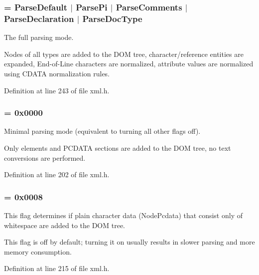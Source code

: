 \hypertarget{namespacephys_1_1xml_af1c356f1eb063a63efebd6c8a5241c63}{
\subsubsection[{ParseFull}]{ = {\bf ParseDefault} $|$ {\bf ParsePi} $|$ {\bf ParseComments} $|$ {\bf ParseDeclaration} $|$ {\bf ParseDocType}}}
\label{d9/d27/namespacephys_1_1xml_af1c356f1eb063a63efebd6c8a5241c63}


The full parsing mode. 

Nodes of all types are added to the DOM tree, character/reference entities are expanded, End-\/of-\/Line characters are normalized, attribute values are normalized using CDATA normalization rules. 

Definition at line 243 of file xml.h.

\hypertarget{namespacephys_1_1xml_ab660837afbc6aaab22425d8d23e8f2e4}{
\subsubsection[{ParseMinimal}]{ = 0x0000}}
\label{d9/d27/namespacephys_1_1xml_ab660837afbc6aaab22425d8d23e8f2e4}


Minimal parsing mode (equivalent to turning all other flags off). 

Only elements and PCDATA sections are added to the DOM tree, no text conversions are performed. 

Definition at line 202 of file xml.h.

\hypertarget{namespacephys_1_1xml_a48c0da99d1ed62b1a4984293e64828c6}{
\subsubsection[{ParseWsPcdata}]{ = 0x0008}}
\label{d9/d27/namespacephys_1_1xml_a48c0da99d1ed62b1a4984293e64828c6}


This flag determines if plain character data (NodePcdata) that consist only of whitespace are added to the DOM tree. 

This flag is off by default; turning it on usually results in slower parsing and more memory consumption. 

Definition at line 215 of file xml.h.

